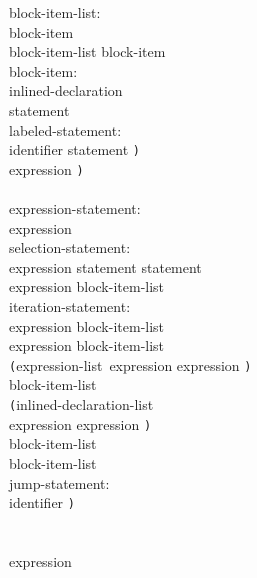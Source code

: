 \documentclass[a4j,twocolumn]{article}
\begin{document}
\noindent
block-item-list: \\
\quad block-item \\
\quad block-item-list block-item \\

\noindent
block-item: \\
\quad inlined-declaration \\
\quad statement \\

\noindent
labeled-statement: \\
 identifier statement {\tt )} \\
 expression {\tt )} \\
 \\

\noindent
expression-statement: \\
\quad expression \\

\noindent
selection-statement: \\
 expression statement statement\opt {\tt )} \\
 expression block-item-list\opt {\tt )} \\

\noindent
iteration-statement: \\
 expression block-item-list\opt {\tt )} \\
 expression block-item-list\opt {\tt )} \\
 {\tt (}expression-list\opt\ expression expression {\tt )}\\
\quad \quad block-item-list\opt {\tt )} \\
 {\tt (}inlined-declaration-list\opt\\
\quad \quad \quad \quad expression expression {\tt )}\\
\quad \quad block-item-list\opt {\tt )} \\
 block-item-list\opt {\tt )} \\

\noindent
jump-statement: \\
 identifier {\tt )} \\
 \\
 \\
 expression\opt {\tt )}

\rm
\end{document}
